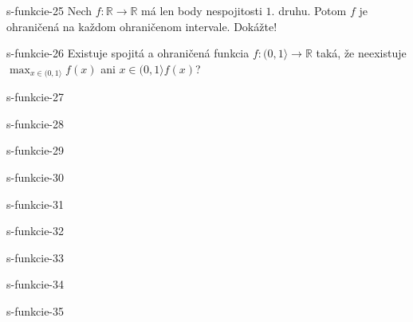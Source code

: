 	\begin{defproblem}{s-funkcie-25}
	Nech $f: \mathbb{R} \rightarrow \mathbb{R}$ má len body nespojitosti $1.$ druhu. Potom $f$ je ohraničená na každom ohraničenom intervale. Dokážte!
	\end{defproblem}
	
	\begin{defproblem}{s-funkcie-26}
	Existuje spojitá a ohraničená funkcia $f:(0,1 \rangle \rightarrow \mathbb{R}$ taká, že neexistuje $\max_{x \in (0,1 \rangle} f(x)$ ani $x \in (0,1 \rangle f(x)$?
	\end{defproblem}
	
	\begin{defproblem}{s-funkcie-27}
	
	\end{defproblem}
	
	\begin{defproblem}{s-funkcie-28}
	
	\end{defproblem}
	
	\begin{defproblem}{s-funkcie-29}
	
	\end{defproblem}
	
	\begin{defproblem}{s-funkcie-30}
	
	\end{defproblem}
	
	\begin{defproblem}{s-funkcie-31}
	
	\end{defproblem}
	
	\begin{defproblem}{s-funkcie-32}
	
	\end{defproblem}
	
	\begin{defproblem}{s-funkcie-33}
	
	\end{defproblem}
	
	\begin{defproblem}{s-funkcie-34}
	
	\end{defproblem}
	
	\begin{defproblem}{s-funkcie-35}
	
	\end{defproblem}
	
